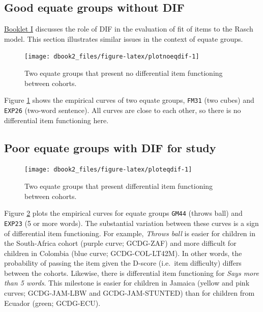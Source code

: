 \documentclass[
]{book}
\begin{document}
\hypertarget{good-equate-groups-without-dif}{%
\subsection{Good equate groups without DIF}\label{good-equate-groups-without-dif}}

\href{https://d-score.org/dbook1/sec-dif.html}{Booklet I} discusses the role of DIF in the evaluation of fit of items to the Rasch model. This section illustrates similar issues in the context of equate groups.

\begin{figure}

{\centering \texttt{[image: dbook2\_files/figure-latex/plotnoeqdif-1]} 

}

\caption{Two equate groups that present no differential item functioning between cohorts.}\label{fig:plotnoeqdif}
\end{figure}



Figure \ref{fig:plotnoeqdif} shows the empirical curves of two equate groups, \texttt{FM31} (two cubes) and \texttt{EXP26} (two-word sentence). All curves are close to each other, so there is no differential item functioning here.

\hypertarget{poor-equate-groups-with-dif-for-study}{%
\subsection{Poor equate groups with DIF for study}\label{poor-equate-groups-with-dif-for-study}}

\begin{figure}

{\centering \texttt{[image: dbook2\_files/figure-latex/ploteqdif-1]} 

}

\caption{Two equate groups that present differential item functioning between cohorts.}\label{fig:ploteqdif}
\end{figure}



Figure \ref{fig:ploteqdif} plots the empirical curves for equate groups \texttt{GM44} (throws ball) and \texttt{EXP23} (5 or more words). The substantial variation between these curves is a sign of differential item functioning. For example, \emph{Throws ball} is easier for children in the South-Africa cohort (purple curve; GCDG-ZAF) and more difficult for children in Colombia (blue curve; GCDG-COL-LT42M). In other words, the probability of passing the item given the D-score (i.e.~item difficulty) differs between the cohorts. Likewise, there is differential item functioning for \emph{Says more than 5 words}. This milestone is easier for children in Jamaica (yellow and pink curves; GCDG-JAM-LBW and GCDG-JAM-STUNTED) than for children from Ecuador (green; GCDG-ECU).
\end{document}
